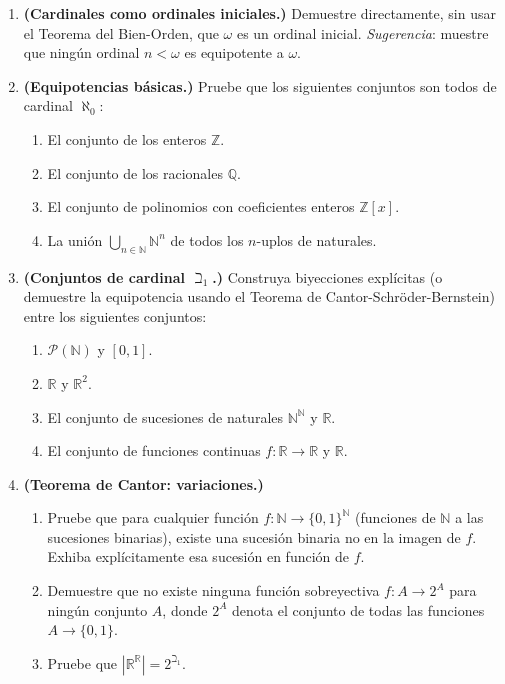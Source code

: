 \begin{enumerate}[leftmargin=2em, label=\textbf{\arabic*.}]

\item \textbf{(Cardinales como ordinales iniciales.)}
Demuestre directamente, sin usar el Teorema del Bien-Orden, que $\omega$ es un ordinal inicial. \emph{Sugerencia}: muestre que ningún ordinal $n < \omega$ es equipotente a $\omega$.

\item \textbf{(Equipotencias básicas.)}
Pruebe que los siguientes conjuntos son todos de cardinal $\aleph_0$:
\begin{enumerate}[label=(\alph*)]
  \item El conjunto de los enteros $\mathbb{Z}$.
  \item El conjunto de los racionales $\mathbb{Q}$.
  \item El conjunto de polinomios con coeficientes enteros $\mathbb{Z}[x]$.
  \item La unión $\bigcup_{n \in \mathbb{N}} \mathbb{N}^n$ de todos los $n$-uplos de naturales.
\end{enumerate}

\item \textbf{(Conjuntos de cardinal $\beth_1$.)}
Construya biyecciones explícitas (o demuestre la equipotencia usando el Teorema de Cantor-Schröder-Bernstein) entre los siguientes conjuntos:
\begin{enumerate}[label=(\alph*)]
  \item $\mathcal{P}(\mathbb{N})$ y $[0,1]$.
  \item $\mathbb{R}$ y $\mathbb{R}^2$.
  \item El conjunto de sucesiones de naturales $\mathbb{N}^{\mathbb{N}}$ y $\mathbb{R}$.
  \item El conjunto de funciones continuas $f \colon \mathbb{R} \to \mathbb{R}$ y $\mathbb{R}$.
\end{enumerate}

\item \textbf{(Teorema de Cantor: variaciones.)}
\begin{enumerate}[label=(\alph*)]
  \item Pruebe que para cualquier función $f \colon \mathbb{N} \to \{0,1\}^{\mathbb{N}}$ (funciones de $\mathbb{N}$ a las sucesiones binarias), existe una sucesión binaria no en la imagen de $f$. Exhiba explícitamente esa sucesión en función de $f$.
  \item Demuestre que no existe ninguna función sobreyectiva $f \colon A \to 2^A$ para ningún conjunto $A$, donde $2^A$ denota el conjunto de todas las funciones $A \to \{0,1\}$.
  \item Pruebe que $|\mathbb{R}^{\mathbb{R}}| = 2^{\beth_1}$.
\end{enumerate}


\end{enumerate}

